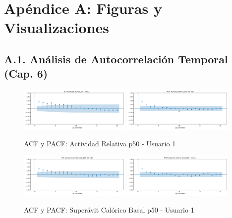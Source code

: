 \documentclass[12pt,letterpaper,twoside]{report}
\begin{document}
\chapter*{Apéndice A: Figuras y Visualizaciones}

\section*{A.1. Análisis de Autocorrelación Temporal (Cap. 6)}

\begin{figure}[H]
\centering
\includegraphics[width=0.48\textwidth]{figuras/acf_Actividad_relativa_p50_u1.png}
\includegraphics[width=0.48\textwidth]{figuras/pacf_Actividad_relativa_p50_u1.png}
\caption{ACF y PACF: Actividad Relativa p50 - Usuario 1}
\end{figure}

\begin{figure}[H]
\centering
\includegraphics[width=0.48\textwidth]{figuras/acf_Superavit_calorico_basal_p50_u1.png}
\includegraphics[width=0.48\textwidth]{figuras/pacf_Superavit_calorico_basal_p50_u1.png}
\caption{ACF y PACF: Superávit Calórico Basal p50 - Usuario 1}
\end{figure}
\end{document}

